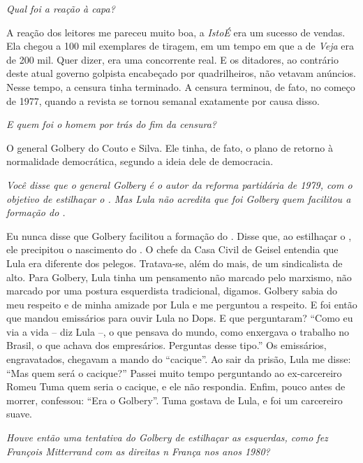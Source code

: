 \itshape
 Qual foi a reação à capa?

\normalfont
A reação dos leitores me pareceu muito boa, a
\emph{IstoÉ} era um sucesso de vendas. Ela chegou a 100 mil exemplares
de tiragem, em um tempo em que a de \emph{Veja} era de 200 mil. Quer
dizer, era uma concorrente real. E os ditadores, ao contrário deste
atual governo golpista encabeçado por quadrilheiros, não vetavam
anúncios. Nesse tempo, a censura tinha terminado. A censura terminou, de
fato, no começo de 1977, quando a revista se tornou semanal exatamente
por causa disso.

\itshape
 E quem foi o homem por trás do fim da censura?

\normalfont
O general Golbery do Couto e Silva. Ele tinha, de fato, o
plano de retorno à normalidade democrática, segundo a ideia dele de
democracia.

\itshape
 Você disse que o general Golbery é o autor da reforma
partidária de 1979, com o objetivo de estilhaçar o . Mas Lula não
acredita que foi Golbery quem facilitou a formação do .

\normalfont
Eu nunca disse que Golbery facilitou a formação do .
Disse que, ao estilhaçar o , ele precipitou o nascimento do . O
chefe da Casa Civil de Geisel entendia que Lula era diferente dos
pelegos. Tratava-se, além do mais, de um sindicalista de  alto. Para
Golbery, Lula tinha um pensamento não marcado pelo marxismo, não marcado
por uma postura esquerdista tradicional, digamos. Golbery sabia do meu
respeito e de minha amizade por Lula e me perguntou a respeito. E foi
então que mandou emissários para ouvir Lula no Dops. E que perguntaram?
``Como eu via a vida -- diz Lula --, o que pensava do mundo, como
enxergava o trabalho no Brasil, o que achava dos empresários. Perguntas
desse tipo.'' Os emissários, engravatados, chegavam a mando do
``cacique''. Ao sair da prisão, Lula me disse: ``Mas quem será o
cacique?'' Passei muito tempo perguntando ao ex-carcereiro Romeu Tuma
quem seria o cacique, e ele não respondia. Enfim, pouco antes de morrer,
confessou: ``Era o Golbery''. Tuma gostava de Lula, e foi um carcereiro
suave.

\itshape
 Houve então uma tentativa do Golbery de estilhaçar as
esquerdas, como fez François Mitterrand com as direitas n França nos
anos 1980?

